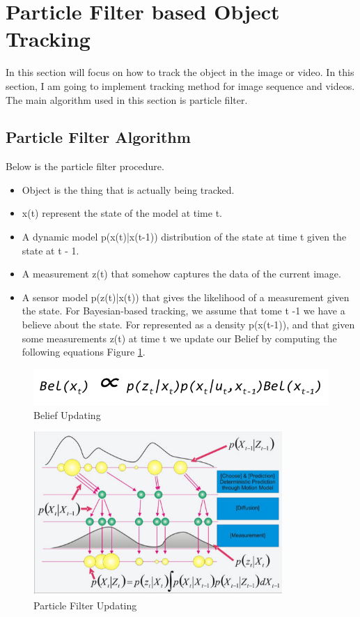 \documentclass[10pt, conference, compsocconf]{IEEEtran}
\begin{document}
\section{Particle Filter based Object Tracking} 
In this section will focus on how to track the object in the image or video. In this section, I am going to implement tracking method for image sequence and videos. The main algorithm used in this section is particle filter. 
\subsection{Particle Filter Algorithm}
Below is the particle filter procedure. 
\begin{itemize}
\item Object is the thing that is actually being tracked.
\item x(t) represent the state of the model at time t.
\item A dynamic model p(x(t)|x(t-1)) distribution of the state at time t given the state at t - 1.
\item A measurement z(t) that somehow captures the data of the current image. 
\item A sensor model p(z(t)|x(t)) that gives the likelihood of a measurement given the state. For Bayesian-based tracking, we assume that tome t -1 we have a believe about the state. For represented as a density p(x(t-1)), and that given some measurements z(t) at time t we update our Belief by computing the following equations Figure \ref{fig:bel}. 
\end{itemize}
\begin{figure}[H]
	\centering
	\includegraphics[scale = 0.30]{image/bel.png}
	\caption{Belief Updating}
	\label{fig:bel}
\end{figure}

\begin{figure}[H]
	\centering
	\includegraphics[scale = 0.50]{image/part_update.png}
	\caption{Particle Filter Updating}
	\label{fig:part_update}
\end{figure}
\end{document}
